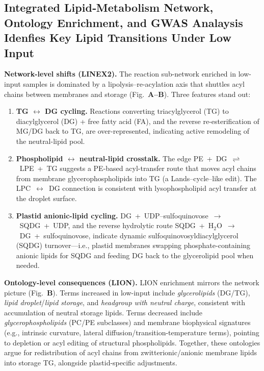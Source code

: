 \documentclass[10pt,letterpaper]{article}
\begin{document}
\begin{itemize}
\subsection*{Integrated Lipid‐Metabolism Network, Ontology Enrichment, and GWAS Analaysis Idenfies Key Lipid Transitions Under Low Input}


\noindent \textbf{Network-level shifts (LINEX2).}
The reaction sub-network enriched in low-input samples is dominated by a lipolysis–re-acylation axis that shuttles acyl chains between membranes and storage (Fig.\ \textbf{A–B}). Three features stand out:
\begin{enumerate}\itemsep3pt
  \item \textbf{TG $\leftrightarrow$ DG cycling.} Reactions converting triacylglycerol (TG) to diacylglycerol (DG) {+} free fatty acid (FA), and the reverse re-esterification of MG/DG back to TG, are over-represented, indicating active remodeling of the neutral-lipid pool.
  \item \textbf{Phospholipid $\leftrightarrow$ neutral-lipid crosstalk.} The edge \mbox{PE + DG $\rightleftharpoons$ LPE + TG} suggests a PE-based acyl-transfer route that moves acyl chains from membrane glycerophospholipids into TG (a Lands–cycle–like edit). The \mbox{LPC $\leftrightarrow$ DG} connection is consistent with lysophospholipid acyl transfer at the droplet surface.
  \item \textbf{Plastid anionic-lipid cycling.} \mbox{DG + UDP–sulfoquinovose $\rightarrow$ SQDG + UDP}, and the reverse hydrolytic route \mbox{SQDG + H$_2$O $\rightarrow$ DG + sulfoquinovose}, indicate dynamic sulfoquinovosyldiacylglycerol (SQDG) turnover—i.e., plastid membranes swapping phosphate-containing anionic lipids for SQDG and feeding DG back to the glycerolipid pool when needed.
\end{enumerate}

\noindent \textbf{Ontology-level consequences (LION).}
LION enrichment mirrors the network picture (Fig.\ \textbf{B}). Terms increased in low-input include \emph{glycerolipids} (DG/TG), \emph{lipid droplet}/\emph{lipid storage}, and \emph{headgroup with neutral charge}, consistent with accumulation of neutral storage lipids. Terms decreased include \emph{glycerophospholipids} (PC/PE subclasses) and membrane biophysical signatures (e.g., intrinsic curvature, lateral diffusion/transition-temperature terms), pointing to depletion or acyl editing of structural phospholipids. Together, these ontologies argue for redistribution of acyl chains from zwitterionic/anionic membrane lipids into storage TG, alongside plastid-specific adjustments.


\end{itemize}
\end{document}
